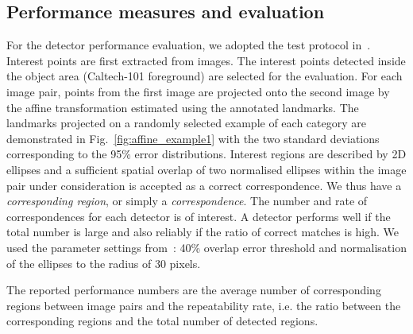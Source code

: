 \documentclass[journal]{IEEEtran}
\begin{document}
%
\subsection{Performance measures and evaluation}
%
For the detector performance evaluation, we adopted the test protocol in~\cite{MikTuySch:2005}.
Interest points are first extracted from images. The interest points detected inside the
object area (Caltech-101 foreground) are selected for the evaluation.
%
For each image pair, points from the first image are projected onto the second image by the
affine transformation estimated using the annotated landmarks.
The landmarks projected on a randomly selected example of each category
are demonstrated in Fig.~\ref{fig:affine_example1} with the
two standard deviations corresponding to the 95\% error distributions.
Interest regions are described by 2D ellipses and
a sufficient spatial overlap of two normalised ellipses within the image pair under consideration is accepted as a correct correspondence. We thus have a {\em corresponding region}, or simply a {\em correspondence}.
The number and rate of correspondences for each detector is of interest. A detector performs well
if the total number is large and also reliably if the ratio of correct matches is high.
We used the parameter settings
from~\cite{MikTuySch:2005}: 40\% overlap error threshold and normalisation of the ellipses to
the radius of 30 pixels. %

The reported performance numbers are the average number of corresponding regions between
image pairs and the repeatability rate, i.e. the ratio between the corresponding 
regions and the total number of detected regions.
\end{document}

